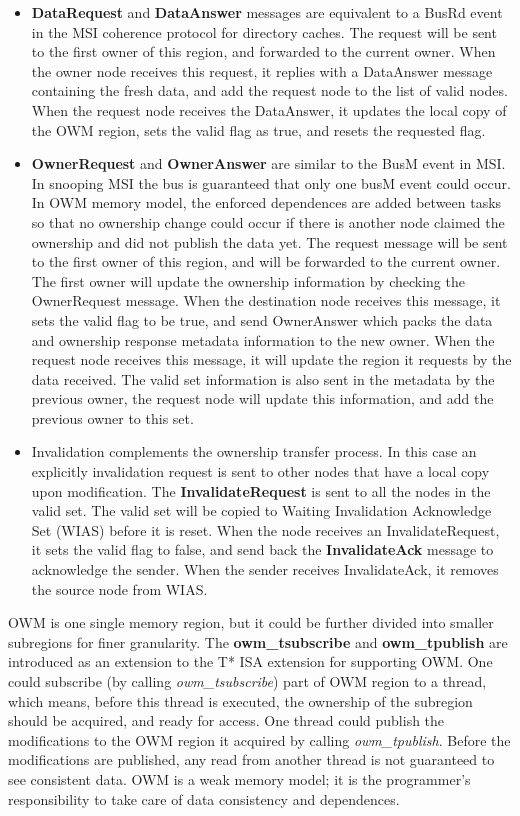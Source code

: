 \documentclass[a4paper]{article}
\begin{document}
\begin{itemize}
\item {
\textbf{DataRequest }and \textbf{DataAnswer} messages are equivalent to
a BusRd event in the MSI coherence protocol for directory caches. The
request will be sent to the first owner of this region, and forwarded
to the current owner. When the owner node receives this request, it
replies with a DataAnswer message containing the fresh data, and add
the request node to the list of valid nodes. When the request node
receives the DataAnswer, it updates the local copy of the OWM region,
sets the valid flag as true, and resets the requested flag.}
\item {
\textbf{OwnerRequest} and \textbf{OwnerAnswer} are similar to the BusM
event in MSI. In snooping MSI the bus is guaranteed that only one busM
event could occur. In OWM memory model, the enforced dependences are
added between tasks so that no ownership change could occur if there is
another node claimed the ownership and did not publish the data yet.
The request message will be sent to the first owner of this region, and
will be forwarded to the current owner. The first owner will update the
ownership information by checking the OwnerRequest message. When the
destination node receives this message, it sets the valid flag to be
true, and send OwnerAnswer which packs the data and ownership response
metadata information to the new owner. When the request node receives
this message, it will update the region it requests by the data
received. The valid set information is also sent in the metadata by the
previous owner, the request node will update this information, and add
the previous owner to this set.}
\item {
Invalidation complements the ownership transfer process. In this case an
explicitly invalidation request is sent to other nodes that have a
local copy upon modification. The \textbf{InvalidateRequest} is sent to
all the nodes in the valid set. The valid set will be copied to Waiting
Invalidation Acknowledge Set (WIAS) before it is reset. When the node
receives an InvalidateRequest, it sets the valid flag to false, and
send back the \textbf{InvalidateAck} message to acknowledge the sender.
When the sender receives InvalidateAck, it removes the source node from
WIAS.}
\end{itemize}
{
OWM is one single memory region, but it could be further divided into
smaller subregions for finer granularity. The \textbf{owm\_tsubscribe}
and \textbf{owm\_tpublish} are introduced as an extension to the T* ISA
extension for supporting OWM. One could subscribe (by calling
\textit{owm\_tsubscribe}) part of OWM region to a thread, which means,
before this thread is executed, the ownership of the subregion should
be acquired, and ready for access. One thread could publish the
modifications to the OWM region it acquired by calling
\textit{owm\_tpublish}. Before the modifications are published, any
read from another thread is not guaranteed to see consistent data. OWM
is a weak memory model; it is the programmer{\textquoteright}s
responsibility to take care of data consistency and dependences.}
\end{document}
